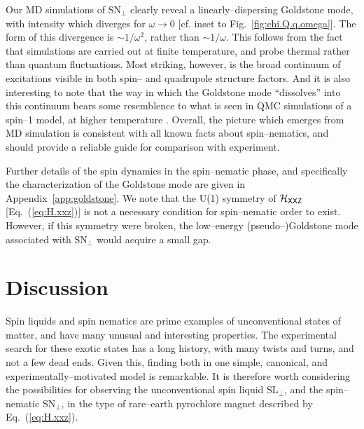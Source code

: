 \documentclass[apsrev4-1,prx,superscriptaddress,floatfix,twocolumn,longbibliography]{revtex4-1}
\begin{document}
Our MD simulations of $\text{SN}_\perp$ clearly reveal a linearly--dispersing Goldstone 
mode, %
with intensity which diverges for $\omega \to 0$ [cf. inset to Fig.~\ref{fig:chi.Q.q.omega}].    
%
The form of this divergence is $\sim 1/\omega^2$, rather than $\sim 1/\omega$.
%
This follows from the fact that simulations are carried out at finite temperature, and 
probe thermal rather than quantum fluctuations.
%
Most striking, however, is the broad continuum of excitations visible in both 
spin-- and quadrupole structure factors.
%
And it is also interesting to note that the way in which the Goldstone mode ``dissolves'' 
into this continuum bears some resemblence to what is seen in QMC simulations 
of a spin--1 model, at higher temperature \cite{voell15}.
%
Overall, the picture which emerges from MD simulation is consistent with all known 
facts about spin--nematics, and should provide a reliable guide for comparison 
with experiment.


Further details of the spin dynamics in the spin--nematic phase,
and specifically the characterization of the Goldstone mode are given in
Appendix~\ref{app:goldstone}.
%
We note that the U(1) symmetry of 
$\mathcal{H}_{\sf XXZ}$ [Eq.~(\ref{eq:H.xxz})] is not a necessary 
condition for spin--nematic order to exist.
%
However, if this symmetry were broken, the low--energy 
\mbox{(pseudo--)Goldstone} mode associated with $\text{SN}_\perp$ 
would acquire a small gap.
\\

\section{Discussion}
\label{sec:discussion}

Spin liquids \cite{anderson73,lee08,balents10} and spin nematics 
\cite{andreev84, chubukov91, shannon06} are prime examples of 
unconventional states of matter, and have many unusual and interesting properties.
%
The experimental search for these exotic states has a long history, 
with many twists and turns, and not a few dead ends.
%
Given this, finding both in one simple, canonical, 
and experimentally--motivated model is remarkable.
%
It is therefore worth considering the possibilities for observing the unconventional 
spin liquid $\text{SL}_\perp$, and the spin--nematic $\text{SN}_\perp$, 
in the type of rare--earth pyrochlore magnet %
described by Eq.~(\ref{eq:H.xxz}).  
\end{document}
